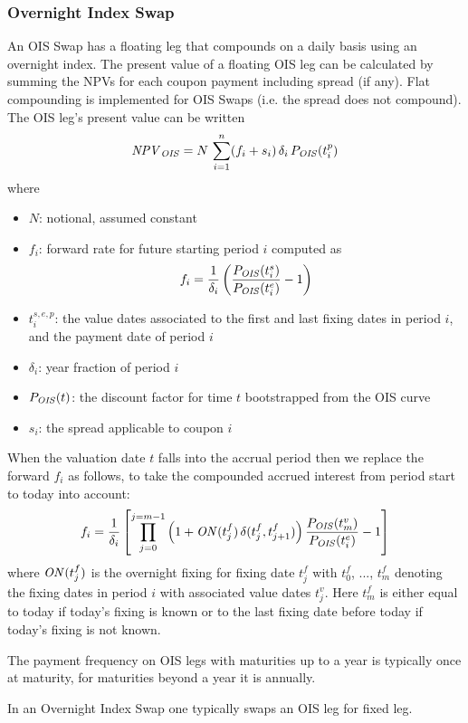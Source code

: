\subsubsection{Overnight Index Swap}
\label{pricing:ir_ois}

An OIS Swap has a floating leg that compounds on a daily basis using an overnight 
index. The present value of a floating OIS leg can be calculated by summing the 
NPVs for each coupon payment including spread (if any). 
Flat compounding is implemented for OIS Swaps (i.e. the spread does not compound).
The  OIS leg's present value can be written
$$
\mathit{NPV}_{\mathit{OIS}}= N \, \sum_{i=1}^n (f_i + s_i)\,\delta_i \,P_{\mathit{OIS}}(t^p_i)
$$
where
\begin{itemize}
\item $N$: notional, assumed constant
\item $f_i$: forward rate for future starting period $i$ computed as 
$$
f_i = \frac{1}{\delta_i} \left(\frac{P_{\mathit{OIS}}(t^s_i)}{P_{\mathit{OIS}}(t^e_i)} - 1\right)
$$ 
\item $t^{s,e,p}_i$: the value dates associated to the first and last fixing dates in period $i$, and the payment date of period $i$
\item $\delta_i$: year fraction of period $i$
\item $P_{\mathit{OIS}}(t)$: the discount factor for time $t$ bootstrapped from the OIS curve
\item $s_i$: the spread applicable to coupon $i$
\end{itemize}

When the valuation date $t$ falls into the accrual period then we replace the forward $f_i$ as follows, to take the
compounded accrued interest from period start to today into account:
$$
f_i = \frac{1}{\delta_i} \left[\prod_{j=0}^{j=m-1} \left(1 + \mathit{ON}(t^f_j)\,\delta(t^f_j, t^f_{j+1})\right) \frac{P_{\mathit{OIS}}(t^v_m)}{P_{\mathit{OIS}}(t^e_i)} - 1\right]
$$
where $\mathit{ON}(t^f_j)$ is the overnight fixing for fixing date $t^f_j$ with $t^f_0$, ..., $t^f_m$ denoting the fixing dates
in period $i$ with associated value dates $t^v_j$. Here $t^f_m$ is either equal to today if today's fixing is known or to
the last fixing date before today if today's fixing is not known.

\medskip
The payment frequency on OIS legs with maturities up to a year is typically once 
at maturity, for maturities beyond a year it is annually.

\medskip
In an Overnight Index Swap one typically swaps an OIS leg for fixed leg.

